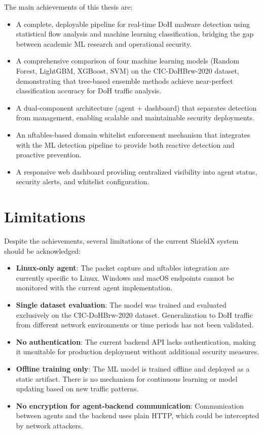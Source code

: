 \documentclass[../Main.tex]{subfiles}
\begin{document}
The main achievements of this thesis are:
\begin{itemize}
    \item A complete, deployable pipeline for real-time DoH malware detection using statistical flow analysis and machine learning classification, bridging the gap between academic ML research and operational security.
    \item A comprehensive comparison of four machine learning models (Random Forest, LightGBM, XGBoost, SVM) on the CIC-DoHBrw-2020 dataset, demonstrating that tree-based ensemble methods achieve near-perfect classification accuracy for DoH traffic analysis.
    \item A dual-component architecture (agent + dashboard) that separates detection from management, enabling scalable and maintainable security deployments.
    \item An nftables-based domain whitelist enforcement mechanism that integrates with the ML detection pipeline to provide both reactive detection and proactive prevention.
    \item A responsive web dashboard providing centralized visibility into agent status, security alerts, and whitelist configuration.
\end{itemize}

\section{Limitations}

Despite the achievements, several limitations of the current ShieldX system should be acknowledged:

\begin{itemize}
    \item \textbf{Linux-only agent}: The packet capture and nftables integration are currently specific to Linux. Windows and macOS endpoints cannot be monitored with the current agent implementation.
    \item \textbf{Single dataset evaluation}: The model was trained and evaluated exclusively on the CIC-DoHBrw-2020 dataset. Generalization to DoH traffic from different network environments or time periods has not been validated.
    \item \textbf{No authentication}: The current backend API lacks authentication, making it unsuitable for production deployment without additional security measures.
    \item \textbf{Offline training only}: The ML model is trained offline and deployed as a static artifact. There is no mechanism for continuous learning or model updating based on new traffic patterns.
    \item \textbf{No encryption for agent-backend communication}: Communication between agents and the backend uses plain HTTP, which could be intercepted by network attackers.
\end{itemize}
\end{document}
